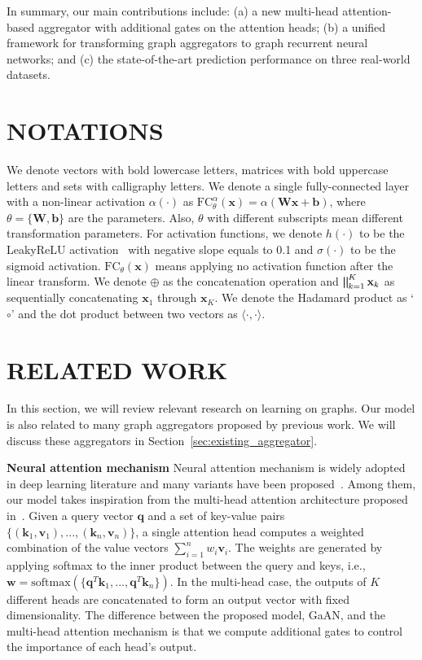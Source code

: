 \documentclass{article}
\begin{document}
	
	In summary, our main contributions include: (a) a new multi-head attention-based aggregator with additional gates on the attention heads; (b) a unified framework for transforming graph aggregators to graph recurrent neural networks; and (c) the state-of-the-art prediction performance on three real-world datasets. 
	
	
	\section{NOTATIONS}
	We denote vectors with bold lowercase letters, matrices with bold uppercase letters and sets with calligraphy letters. We denote a single fully-connected layer with a non-linear activation $\alpha(\cdot)$ as $\text{FC}_\theta^{\alpha}(\mathbf{x}) = \alpha(\mathbf{W}\mathbf{x} +\mathbf{b})$, where $\theta = \{\mathbf{W}, \mathbf{b}\}$ are the parameters.
	Also, $\theta$ with different subscripts mean different transformation parameters.
	For activation functions, we denote $h(\cdot)$ to be the LeakyReLU activation~\citep{xu2015empirical} with negative slope equals to 0.1 and $\sigma(\cdot)$ to be the sigmoid activation. $\text{FC}_\theta(\mathbf{x})$ means applying no activation function after the linear transform. We denote $\oplus$ as the concatenation operation and $\bigparallel_{k=1}^K \mathbf{x}_k$ as sequentially concatenating $\mathbf{x}_1$ through $\mathbf{x}_K$. We denote the Hadamard product as `$\circ$' and the dot product between two vectors as $\langle \cdot, \cdot \rangle$. 
	
\section{RELATED WORK}
	In this section, we will review relevant research on learning on graphs. Our model is also related to many graph aggregators proposed by previous work. We will discuss these aggregators in Section~\ref{sec:existing_aggregator}.
	
	
	\textbf{Neural attention mechanism}\quad
	Neural attention mechanism is widely adopted in deep learning literature and many variants have been proposed~\citep{chorowski2014end, xu2015show, seo2016bidirectional, vaswani2017attention}. Among them, our model takes inspiration from the multi-head attention architecture proposed in~\citep{vaswani2017attention}. Given a query vector $\mathbf{q}$ and a set of key-value pairs $\{(\mathbf{k}_1, \mathbf{v}_1), ..., (\mathbf{k}_n, \mathbf{v}_n)\}$, a single attention head computes a weighted combination of the value vectors $\sum_{i=1}^n w_i \textbf{v}_i$. The weights are generated by applying softmax to the inner product between the query and keys, i.e., $\mathbf{w} = \text{softmax}(\{\mathbf{q}^T\mathbf{k}_1, ...,  \mathbf{q}^T\mathbf{k}_n\})$. In the multi-head case, the outputs of $K$ different heads are concatenated to form an output vector with fixed dimensionality. The difference between the proposed model, GaAN, and the multi-head attention mechanism is that we compute additional gates to control the importance of each head's output.
\end{document}
